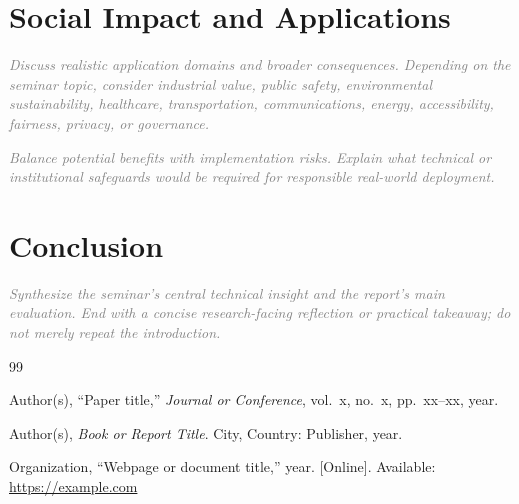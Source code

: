 \documentclass[a4paper,12pt]{article}
\newcommand{\placeholder}[1]{\textcolor{gray}{\textit{#1}}}
\begin{document}
\section{Social Impact and Applications}

\placeholder{Discuss realistic application domains and broader consequences. Depending on the seminar topic, consider industrial value, public safety, environmental sustainability, healthcare, transportation, communications, energy, accessibility, fairness, privacy, or governance.}

\placeholder{Balance potential benefits with implementation risks. Explain what technical or institutional safeguards would be required for responsible real-world deployment.}

\section{Conclusion}

\placeholder{Synthesize the seminar's central technical insight and the report's main evaluation. End with a concise research-facing reflection or practical takeaway; do not merely repeat the introduction.}

\clearpage
\begin{thebibliography}{99}

Author(s), ``Paper title,'' \textit{Journal or Conference}, vol.~x, no.~x, pp.~xx--xx, year.

Author(s), \textit{Book or Report Title}. City, Country: Publisher, year.

Organization, ``Webpage or document title,'' year. [Online]. Available: \url{https://example.com}

\end{thebibliography}
\end{document}

